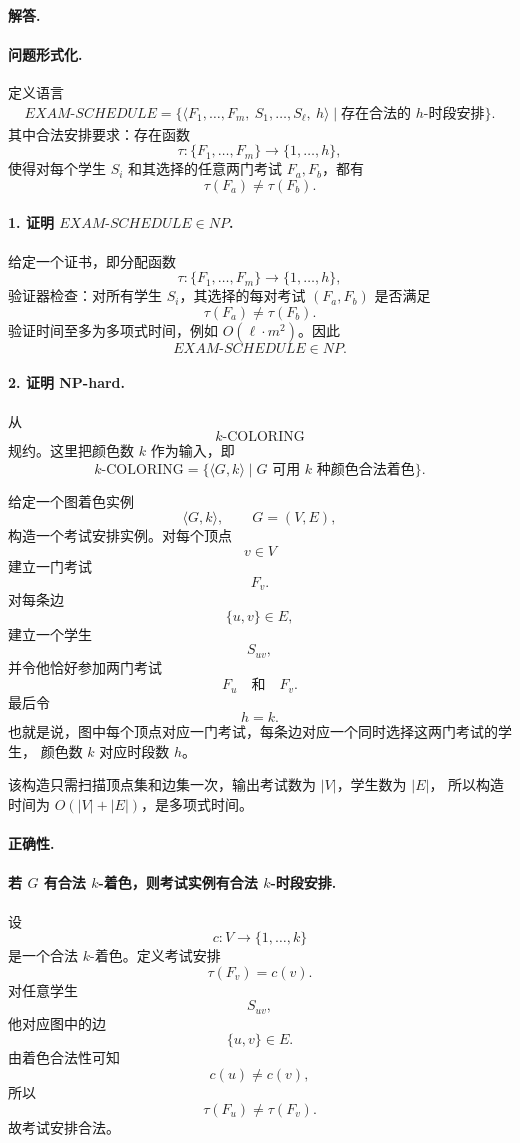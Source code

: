 \begin{answerred}
\paragraph{解答.}
\paragraph{问题形式化.}
定义语言
\[
\begin{aligned}
EXAM\text{-}SCHEDULE
=
\{\langle F_1,\dots,F_m,\ S_1,\dots,S_\ell,\ h\rangle
\mid \text{存在合法的 }h\text{-时段安排}\}.
\end{aligned}
\]
其中合法安排要求：存在函数
\[
\tau:\{F_1,\dots,F_m\}\to\{1,\dots,h\},
\]
使得对每个学生 $S_i$ 和其选择的任意两门考试 $F_a,F_b$，都有
\[
\tau(F_a)\ne \tau(F_b).
\]

\paragraph{1. 证明 \(EXAM\text{-}SCHEDULE\in NP\).}
给定一个证书，即分配函数
\[
\tau:\{F_1,\dots,F_m\}\to\{1,\dots,h\},
\]
验证器检查：对所有学生 $S_i$，其选择的每对考试 $(F_a,F_b)$ 是否满足
\[
\tau(F_a)\ne \tau(F_b).
\]
验证时间至多为多项式时间，例如 $O(\ell\cdot m^2)$。因此
\[
EXAM\text{-}SCHEDULE\in NP.
\]

\paragraph{2. 证明 NP-hard.}
从
\[
k\text{-COLORING}
\]
规约。这里把颜色数 $k$ 作为输入，即
\[
k\text{-COLORING}
=
\{\langle G,k\rangle \mid G \text{ 可用 }k\text{ 种颜色合法着色}\}.
\]

给定一个图着色实例
\[
\langle G,k\rangle,
\qquad
G=(V,E),
\]
构造一个考试安排实例。对每个顶点
\[
v\in V
\]
建立一门考试
\[
F_v.
\]
对每条边
\[
\{u,v\}\in E,
\]
建立一个学生
\[
S_{uv},
\]
并令他恰好参加两门考试
\[
F_u\quad\text{和}\quad F_v.
\]
最后令
\[
h=k.
\]
也就是说，图中每个顶点对应一门考试，每条边对应一个同时选择这两门考试的学生，
颜色数 $k$ 对应时段数 $h$。

该构造只需扫描顶点集和边集一次，输出考试数为 $|V|$，学生数为 $|E|$，
所以构造时间为 $O(|V|+|E|)$，是多项式时间。

\paragraph{正确性.}

\paragraph{若 \(G\) 有合法 \(k\)-着色，则考试实例有合法 \(k\)-时段安排.}
设
\[
c:V\to\{1,\dots,k\}
\]
是一个合法 $k$-着色。定义考试安排
\[
\tau(F_v)=c(v).
\]
对任意学生
\[
S_{uv},
\]
他对应图中的边
\[
\{u,v\}\in E.
\]
由着色合法性可知
\[
c(u)\ne c(v),
\]
所以
\[
\tau(F_u)\ne \tau(F_v).
\]
故考试安排合法。


\end{answerred}
